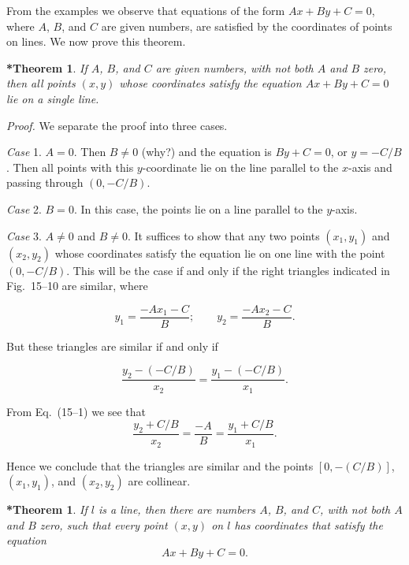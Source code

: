 \documentclass[11pt]{book}
\theoremstyle{bkplain}
\newtheorem{XVstheorem}[theorem]{*Theorem}
\begin{document}
From the examples we observe that equations of the form $Ax + By + C = 0$,
where $A$, $B$, and $C$ are given numbers, are satisfied by the coordinates of
points on lines. We now prove this theorem.

\begin{XVstheorem}
If $A$, $B$, and $C$ are given numbers, with not both $A$ and $B$ zero, then
all points $(x, y)$ whose coordinates satisfy the equation $Ax + By + C = 0$
lie on a single line.
\end{XVstheorem}

\noindent\emph{Proof.}
We separate the proof into three cases.

\emph{Case} 1. $A = 0$. Then $B \neq 0$ (why?) and the equation is
$By + C = 0$, or $y = -C/B$. Then all points with this $y$-coordinate lie on
the line parallel to the $x$-axis and passing through $(0, -C/B)$.

\emph{Case} 2. $B = 0$. In this case, the points lie on a line parallel to the
$y$-axis.

\emph{Case} 3. $A \neq 0$ and $B \neq 0$. It suffices to show that any two
points $(x_1, y_1)$ and $(x_2, y_2)$ whose coordinates satisfy the equation
lie on one line with the point $(0, -C/B)$. This will be the case if and only
if the right triangles indicated in Fig.~15--10 are similar, where

\begin{equation}\tag{15--1}
y_1 = \frac{-Ax_1-C}{B}; \qquad y_2 = \frac{-Ax_2-C}{B}.
\end{equation}

\FIGXVTENELEVEN

But these triangles are similar if and only if

\begin{equation}\tag{15--2}
\frac{y_2-(-C/B)}{x_2} = \frac{y_1-(-C/B)}{x_1}.
\end{equation}

From Eq.~(15--1) we see that
\[
\frac{y_2+C/B}{x_2} = \frac{-A}{B} = \frac{y_1+C/B}{x_1}.
\]

Hence we conclude that the triangles are similar and the points
$[0, -(C/B)]$, $(x_1, y_1)$, and $(x_2, y_2)$ are collinear.

\begin{XVstheorem}
If $l$ is a line, then there are numbers $A$, $B$, and $C$, with not both $A$
and $B$ zero, such that every point $(x, y)$ on $l$ has coordinates that
satisfy the equation
\begin{equation}\tag{15--3}
Ax + By + C = 0.
\end{equation}
\end{XVstheorem}
\end{document}
